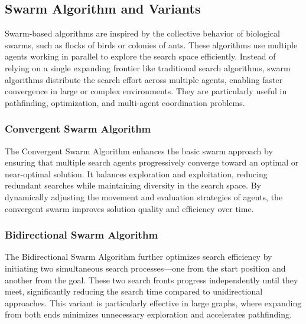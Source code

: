 \subsection{Swarm Algorithm and Variants}
\noindent Swarm-based algorithms are inspired by the collective behavior of biological swarms, such as flocks of birds or colonies of ants. These algorithms use multiple agents working in parallel to explore the search space efficiently. Instead of relying on a single expanding frontier like traditional search algorithms, swarm algorithms distribute the search effort across multiple agents, enabling faster convergence in large or complex environments. They are particularly useful in pathfinding, optimization, and multi-agent coordination problems.
\subsubsection{Convergent Swarm Algorithm}
\noindent The Convergent Swarm Algorithm enhances the basic swarm approach by ensuring that multiple search agents progressively converge toward an optimal or near-optimal solution. It balances exploration and exploitation, reducing redundant searches while maintaining diversity in the search space. By dynamically adjusting the movement and evaluation strategies of agents, the convergent swarm improves solution quality and efficiency over time.
\subsubsection{Bidirectional Swarm Algorithm}
\noindent The Bidirectional Swarm Algorithm further optimizes search efficiency by initiating two simultaneous search processes—one from the start position and another from the goal. These two search fronts progress independently until they meet, significantly reducing the search time compared to unidirectional approaches. This variant is particularly effective in large graphs, where expanding from both ends minimizes unnecessary exploration and accelerates pathfinding.


